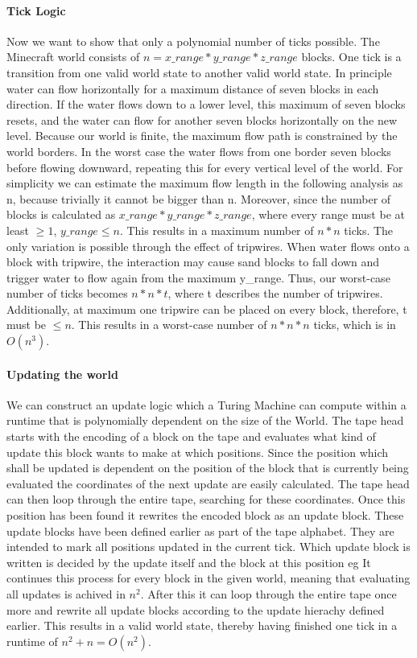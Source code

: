 	\paragraph{Tick Logic}
	Now we want to show that only a polynomial number of ticks possible. The Minecraft world consists of $n = x\_range * y\_range * z\_range$ blocks. One tick is a     transition from one valid world state to another valid world state. In principle water can flow horizontally for a maximum distance of seven blocks in each  direction. If the water flows down to a lower level, this maximum of seven blocks resets, and the water can flow for another seven blocks horizontally on the new level. Because our world is finite, the maximum flow path is constrained by the world borders. In the worst case the water flows from one border seven blocks before flowing downward, repeating this for every vertical level of the world. For simplicity we can estimate the maximum flow length in the following analysis as n, because trivially it cannot be bigger than n. Moreover, since the number of blocks is calculated as $x\_range * y\_range * z\_range$, where every range must be at least $\geq 1$, $y\_range \leq n$. This results in a maximum number of $n * n$ ticks. The only variation is possible through the effect of tripwires. When water flows onto a block with tripwire, the interaction may cause sand blocks to fall down and trigger water to flow again from the maximum y\_range. Thus, our worst-case number of ticks becomes $n * n * t$, where t describes the number of tripwires. Additionally, at maximum one tripwire can be placed on every block, therefore, t must be $\leq n$. This results in a worst-case number of $n * n * n$ ticks, which is in $O(n^{3})$.
	
	
	\paragraph{Updating the world}
	We can construct an update logic which a Turing Machine can compute within a runtime that is polynomially dependent on the size of the World.
	The tape head starts with the encoding of a block on the tape and evaluates what kind of update this block wants to make at which positions.
	Since the position which shall be updated is dependent on the position of the block that is currently being evaluated the coordinates of the next update are easily calculated.
	The tape head can then loop through the entire tape, searching for these coordinates.
	Once this position has been found it rewrites the encoded block as an update block.
	These update blocks have been defined earlier as part of the tape alphabet. They are intended to mark all positions updated in the current tick.
	Which update block is written is decided by the update itself and the block at this position eg 
	It continues this process for every block in the given world, meaning that evaluating all updates is achived in $n^2$.
	After this it can loop through the entire tape once more and rewrite all update blocks according to the update hierachy defined earlier.
	This results in a valid world state, thereby having finished one tick in a runtime of $n^{2} + n = O(n^{2})$.

